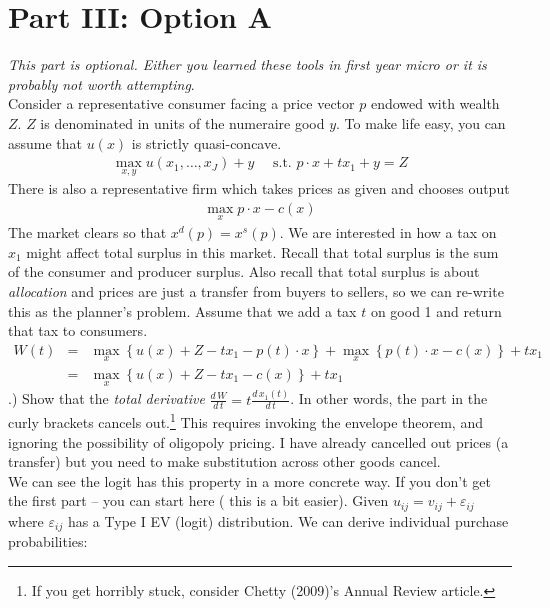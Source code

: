 \documentclass[12pt]{article}
\begin{document}
\section*{\normalsize Part III: Option A}
\textit{This part is optional. Either you learned these tools in first year micro or it is probably not worth attempting}.\\



\noindent Consider a representative consumer facing a price vector $p$ endowed with wealth $Z$. $Z$ is denominated in units of the numeraire good $y$. To make life easy, you can assume that $u(x)$ is strictly quasi-concave.
\begin{eqnarray*}
\max_{x,y} u(x_1,\ldots,x_J) + y \quad \mbox{ s.t. } p \cdot x + t x_1 + y = Z
\end{eqnarray*}
There is also a representative firm which takes prices as given and chooses output
\begin{eqnarray*}
\max_x p \cdot x - c(x)
\end{eqnarray*}
The market clears so that $x^d(p) = x^s(p)$. We are interested in how a tax on $x_1$ might affect total surplus in this market. Recall that total surplus is the sum of the consumer and producer surplus. Also recall that total surplus is about \textit{allocation} and prices are just a transfer from buyers to sellers, so we can re-write this as the planner's problem. Assume that we add a tax $t$ on good 1 and return that tax to consumers.
\begin{eqnarray*}
W(t) &=& \max_x \left\{  u(x) + Z - t x_1 - p(t) \cdot x \right\}  + \max_x \left\{  p(t) \cdot x - c(x)\right\} + t x_1\\
&=& \max_x \left\{  u(x) + Z - t x_1  - c(x)\right\} + t x_1
\end{eqnarray*}
.) Show that the \textit{total derivative} $\frac{d\, W}{d\, t} = t \frac{d\, x_1(t)}{d\, t}$. In other words, the part in the curly brackets cancels out.\footnote{If you get horribly stuck, consider Chetty (2009)'s Annual Review article.} This requires invoking the envelope theorem, and ignoring the possibility of oligopoly pricing. I have already cancelled out prices (a transfer) but you need to make substitution across other goods cancel.\\

We can see the logit has this property in a more concrete way. If you don't get the first part -- you can start here ( this is a bit easier). Given $u_{ij} = v_{ij} + \varepsilon_{ij}$ where $\varepsilon_{ij}$ has a Type I EV (logit) distribution. We can derive individual purchase probabilities:
\end{document}

